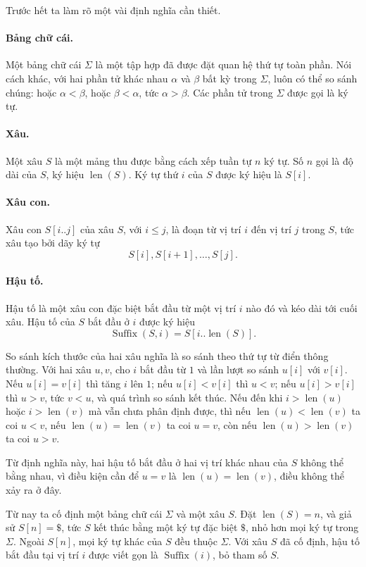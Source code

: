 \documentclass[11pt]{article}
\newcommand{\Suf}{\operatorname{Suffix}}
\newcommand{\Len}{\operatorname{len}}
\begin{document}
Trước hết ta làm rõ một vài định nghĩa cần thiết.

\paragraph{Bảng chữ cái.}
Một bảng chữ cái \(\Sigma\) là một tập hợp đã được đặt quan hệ thứ tự toàn
phần. Nói cách khác, với hai phần tử khác nhau \(\alpha\) và \(\beta\) bất kỳ
trong \(\Sigma\), luôn có thể so sánh chúng: hoặc \(\alpha<\beta\), hoặc
\(\beta<\alpha\), tức \(\alpha>\beta\). Các phần tử trong \(\Sigma\) được gọi
là ký tự.

\paragraph{Xâu.}
Một xâu \(S\) là một mảng thu được bằng cách xếp tuần tự \(n\) ký tự. Số
\(n\) gọi là độ dài của \(S\), ký hiệu \(\Len(S)\). Ký tự thứ \(i\) của \(S\)
được ký hiệu là \(S[i]\).

\paragraph{Xâu con.}
Xâu con \(S[i..j]\) của xâu \(S\), với \(i\le j\), là đoạn từ vị trí \(i\)
đến vị trí \(j\) trong \(S\), tức xâu tạo bởi dãy ký tự
\[
  S[i],S[i+1],\ldots,S[j].
\]

\paragraph{Hậu tố.}
Hậu tố là một xâu con đặc biệt bắt đầu từ một vị trí \(i\) nào đó và kéo dài
tới cuối xâu. Hậu tố của \(S\) bắt đầu ở \(i\) được ký hiệu
\[
  \Suf(S,i)=S[i..\Len(S)].
\]

So sánh kích thước của hai xâu nghĩa là so sánh theo thứ tự từ điển thông
thường. Với hai xâu \(u,v\), cho \(i\) bắt đầu từ \(1\) và lần lượt so sánh
\(u[i]\) với \(v[i]\). Nếu \(u[i]=v[i]\) thì tăng \(i\) lên \(1\); nếu
\(u[i]<v[i]\) thì \(u<v\); nếu \(u[i]>v[i]\) thì \(u>v\), tức \(v<u\), và
quá trình so sánh kết thúc. Nếu đến khi \(i>\Len(u)\) hoặc \(i>\Len(v)\) mà
vẫn chưa phân định được, thì nếu \(\Len(u)<\Len(v)\) ta coi \(u<v\), nếu
\(\Len(u)=\Len(v)\) ta coi \(u=v\), còn nếu \(\Len(u)>\Len(v)\) ta coi
\(u>v\).

Từ định nghĩa này, hai hậu tố bắt đầu ở hai vị trí khác nhau của \(S\) không
thể bằng nhau, vì điều kiện cần để \(u=v\) là \(\Len(u)=\Len(v)\), điều không
thể xảy ra ở đây.

Từ nay ta cố định một bảng chữ cái \(\Sigma\) và một xâu \(S\). Đặt
\(\Len(S)=n\), và giả sử \(S[n]=\texttt{\$}\), tức \(S\) kết thúc bằng một ký
tự đặc biệt \(\texttt{\$}\), nhỏ hơn mọi ký tự trong \(\Sigma\). Ngoài
\(S[n]\), mọi ký tự khác của \(S\) đều thuộc \(\Sigma\). Với xâu \(S\) đã cố
định, hậu tố bắt đầu tại vị trí \(i\) được viết gọn là \(\Suf(i)\), bỏ tham
số \(S\).
\end{document}
